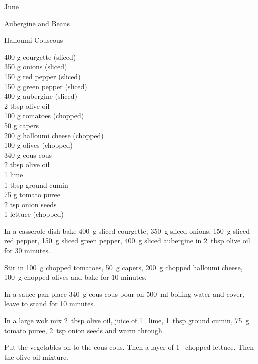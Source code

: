 \begin{menu}{June}
\begin{recipe}{2}{Aubergine and Beans}
\begin{instructions}
    \end{instructions}
    \end{recipe}%
  
    \begin{recipe}{2}{Halloumi Couscous}%
		\begin{ingredients}
		400 g courgette (sliced) \\
	350 g onions (sliced) \\
	150 g red pepper (sliced) \\
	150 g green pepper (sliced) \\
	400 g aubergine (sliced) \\
	2 tbsp olive oil  \\
	100 g tomatoes (chopped) \\
	50 g capers  \\
	200 g halloumi cheese (chopped) \\
	100 g olives (chopped) \\
	340 g cous cous  \\
	2 tbsp olive oil  \\
	1  lime  \\
	1 tbsp ground cumin  \\
	75 g tomato puree  \\
	2 tsp onion seeds  \\
	1  lettuce (chopped) \\
	
		\end{ingredients}
	
	
    \begin{instructions}
    \item 
        In a casserole dish bake
        400~g sliced courgette,
        350~g sliced onions,
        150~g sliced red pepper,
        150~g sliced green pepper,
        400~g sliced aubergine
        in
        2~tbsp  olive oil
        for 30 minutes.
      \item 
        Stir in
        100~g chopped tomatoes,
        50~g  capers,
        200~g chopped halloumi cheese,
        100~g chopped olives
        and bake for 10 minutes.
      \item 
    In a
    sauce pan
    place
    340~g  cous cous
    pour on
    500~ml  boiling water
    and cover, leave to stand for 10 minutes.
  \item 
        In a large wok mix
        2~tbsp  olive oil,
        juice of
        1~  lime,
        1~tbsp  ground cumin,
        75~g  tomato puree,
        2~tsp  onion seeds
        and warm through.
      \item 
        Put the vegetables on to the cous cous.
        Then a layer of
        1~ chopped lettuce.
        Then the olive oil mixture.
      

\end{instructions}
\end{recipe}
\end{menu}
